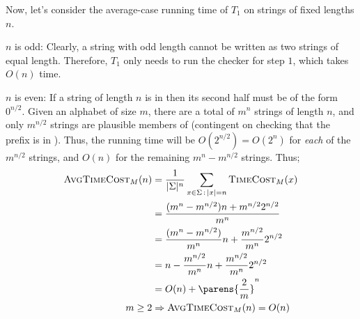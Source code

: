 \begin{Answer}
  \step
  Now, let's consider the average-case running time of $T_1$
  on strings of fixed lengths $n$.
  \begin{enumroman}
    \item $n$ is odd:
      Clearly, a string with odd length cannot be written as two strings of equal length.
      Therefore, $T_1$ only needs to run the checker for step $1$, which
      takes $O(n)$ time.
    \item $n$ is even:
      If a string of length $n$ is in \WSAT
      then its second half must be of the form $0^{n/2}$.
      Given an alphabet of size $m$, there are a total of $m^{n}$ strings of length $n$,
      and only $m^{n/2}$ strings are plausible members of \WSAT
      (contingent on checking that the prefix is in \SAT).
      Thus, the running time will be $O(2^{n/2}) = O(2^n)$ for \emph{each} of the $m^{n/2}$ strings,
      and $O(n)$ for the remaining $m^n - m^{n/2}$ strings.
      Thus;
      \begin{align*}
        \AvgTCost(n) &= \frac{1}{\abs{\Sigma}^n} \sum_{x \in \Sigma \,:\, \abs{x} = n} \TCost(x) \\
        &= \frac{(m^n - m^{n/2}) n + m^{n/2} 2^{n/2}}{m^n}  \\
        &= \frac{(m^n - m^{n/2})}{m^n} n + \frac{m^{n/2}}{m^n} 2^{n/2} \\ 
        &= n - \frac{m^{n/2}}{m^n} n + \frac{m^{n/2}}{m^n} 2^{n/2} \\
        &= O(n) + \parens{\frac{2}{m}}^n \\
        m \ge 2 &\Rightarrow \AvgTCost(n) = O(n)
      \end{align*}
  \end{enumroman}
\end{Answer}
